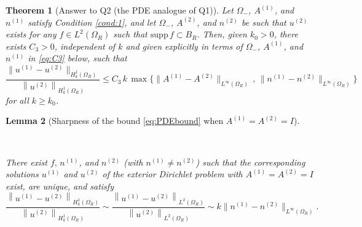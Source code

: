 \documentclass[10pt]{article}%
\newtheorem{theorem}{Theorem}[section]
\newtheorem{lemma}[theorem]{Lemma}
\numberwithin{equation}{section}
\newcommand{\beq}{\begin{equation}}
\newcommand{\eeq}{\end{equation}}
\newcommand{\ble}{\begin{lemma}}
\newcommand{\ele}{\end{lemma}}
\newcommand{\noi}{\noindent}
\newcommand{\supp}{\mathrm{supp}}
\newcommand{\Oi}{{\Omega_-}}
\newcommand{\HoDkk}{{H^1_{k}(\domain_R)}}
\newcommand*{\N}[1]{\left\|#1\right\|}
\newcommand{\domain}{\Omega}
\newcommand{\coeffAj}{A^{(j)}}
\newcommand{\coeffAo}{A^{(1)}}
\newcommand{\coeffAt}{A^{(2)}}
\newcommand{\coeffno}{n^{(1)}}
\newcommand{\coeffnt}{n^{(2)}}
\begin{document}

\begin{theorem}[Answer to Q2 (the PDE analogue of Q1)]\label{thm:2}
Let $\Oi$, $\coeffAo$, and $\coeffno$ satisfy Condition \ref{cond:1}, and let $\Oi$, $\coeffAt$, and $\coeffnt$ be such that $u^{(2)}$ exists
for any $f\in L^2(\Omega_R)$ such that $\supp \, f \subset B_R$. 
Then, given $k_0>0$, there exists $C_3>0$, independent of $k$ and given explicitly in terms of $\Oi$, $\coeffAo$, and $\coeffno$ in \eqref{eq:C3} below, such that
\beq\label{eq:PDEbound}
\frac{\big\|u^{(1)}-u^{(2)}\big\|_{\HoDkk}
}{
\N{u^{(2)}}_{\HoDkk}
}\leq C_3 \,k\, \max\Big\{\big\|\coeffAo-\coeffAt\big\|_{L^\infty(\Omega_R)}\,,\, \big\|\coeffno-\coeffnt\big\|_{L^\infty(\Omega_R)}\Big\}%
\eeq
for all $k\geq k_0$. 
\end{theorem}

\ble[Sharpness of the bound \eqref{eq:PDEbound} when $\coeffAo = \coeffAt= I$]\label{lem:sharp}

\

\noi 
There exist $f, \,\coeffno$, and $\coeffnt$ (with $\coeffno\neq \coeffnt$) such that 
the corresponding solutions $u^{(1)}$ and $u^{(2)}$ of the exterior Dirichlet problem with $\coeffAo = \coeffAt= I$ exist, are unique, and satisfy
\beq\label{eq:sharp1}
\frac{\N{u^{(1)}-u^{(2)}}_{\HoDkk}
}{
\N{u^{(2)}}_{\HoDkk}
}
\sim 
\frac{\N{u^{(1)}-u^{(2)}}_{L^2(\Omega_R)}
}{
\N{u^{(2)}}_{L^2(\Omega_R)}
}\sim k \big\|\coeffno-\coeffnt\big\|_{L^\infty(\Omega_R)}.
\eeq
\ele
\end{document}
